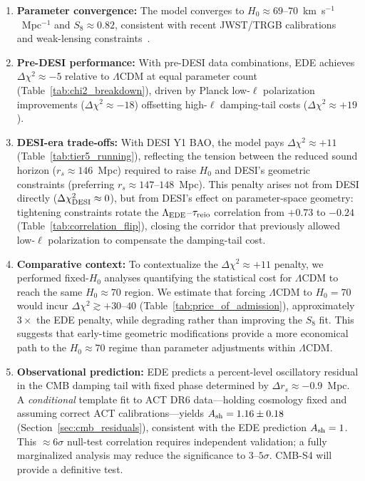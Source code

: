 \documentclass[a4paper,11pt]{article}
\begin{document}
\begin{enumerate}
    \item \textbf{Parameter convergence:} The model converges to $H_0 \approx 69$--$70$~km~s$^{-1}$~Mpc$^{-1}$ and $S_8 \approx 0.82$, consistent with recent JWST/TRGB calibrations~\cite{Freedman2024} and weak-lensing constraints~\cite{DES_Y3}.
    
    \item \textbf{Pre-DESI performance:} With pre-DESI data combinations, EDE achieves $\Delta\chi^2 \approx -5$ relative to $\Lambda$CDM at equal parameter count (Table~\ref{tab:chi2_breakdown}), driven by Planck low-$\ell$ polarization improvements ($\Delta\chi^2 \approx -18$) offsetting high-$\ell$ damping-tail costs ($\Delta\chi^2 \approx +19$).
    
    \item \textbf{DESI-era trade-offs:} With DESI Y1 BAO, the model pays $\Delta\chi^2 \approx +11$ (Table~\ref{tab:tier5_running}), reflecting the tension between the reduced sound horizon ($r_s \approx 146$~Mpc) required to raise $H_0$ and DESI's geometric constraints (preferring $r_s \approx 147$--$148$~Mpc). This penalty arises not from DESI directly ($\Delta\chi^2_{\rm DESI} \approx 0$), but from DESI's effect on parameter-space geometry: tightening constraints rotate the $\Lambda_{\rm EDE}$--$\tau_{\rm reio}$ correlation from $+0.73$ to $-0.24$ (Table~\ref{tab:correlation_flip}), closing the corridor that previously allowed low-$\ell$ polarization to compensate the damping-tail cost.
    
    \item \textbf{Comparative context:} To contextualize the $\Delta\chi^2 \approx +11$ penalty, we performed fixed-$H_0$ analyses quantifying the statistical cost for $\Lambda$CDM to reach the same $H_0 \approx 70$ region. We estimate that forcing $\Lambda$CDM to $H_0 = 70$ would incur $\Delta\chi^2 \gtrsim +30$--$40$ (Table~\ref{tab:price_of_admission}), approximately $3\times$ the EDE penalty, while degrading rather than improving the $S_8$ fit. This suggests that early-time geometric modifications provide a more economical path to the $H_0 \approx 70$ regime than parameter adjustments within $\Lambda$CDM.
    
    \item \textbf{Observational prediction:} EDE predicts a percent-level oscillatory residual in the CMB damping tail with fixed phase determined by $\Delta r_s \approx -0.9$~Mpc. A \emph{conditional} template fit to ACT DR6 data---holding cosmology fixed and assuming correct ACT calibrations---yields $A_{\rm sh} = 1.16 \pm 0.18$ (Section~\ref{sec:cmb_residuals}), consistent with the EDE prediction $A_{\rm sh} = 1$. This $\approx 6\sigma$ null-test correlation requires independent validation; a fully marginalized analysis may reduce the significance to $3$--$5\sigma$. CMB-S4 will provide a definitive test.
\end{enumerate}
\end{document}
